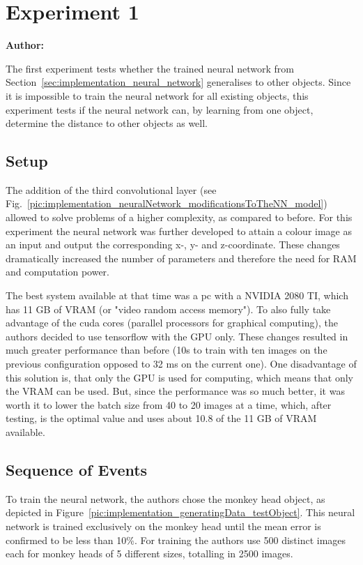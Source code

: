 \chapter{Experiment 1}
\label{cap:experiment1}

\textbf{Author: } 

The first experiment tests whether the trained neural network from Section~\ref{sec:implementation_neural_network} generalises to other objects. Since it is impossible to train the neural network for all existing objects, this experiment tests if the neural network can, by learning from one object, determine the distance to other objects as well.

\section{Setup}
The addition of the third convolutional layer (see Fig.~\ref{pic:implementation_neuralNetwork_modificationsToTheNN_model}) allowed to solve problems of a higher complexity, as compared to before. For this experiment the neural network was further developed to attain a colour image as an input and output the corresponding x-, y- and z-coordinate. These changes dramatically increased the number of parameters and therefore the need for RAM and computation power. 

The best system available at that time was a pc with a NVIDIA 2080 TI, which has 11 GB of VRAM (or "video random access memory"). To also fully take advantage of the cuda cores (parallel processors for graphical computing), the authors decided to use tensorflow with the GPU only. These changes resulted in much greater performance than before (10s to train with ten images on the previous configuration opposed to 32 ms on the current one). One disadvantage of this solution is, that only the GPU is used for computing, which means that only the VRAM can be used. But, since the performance was so much better, it was worth it to lower the batch size from 40 to 20 images at a time, which, after testing, is the optimal value and uses about 10.8 of the 11 GB of VRAM available.

\section{Sequence of Events}
To train the neural network, the authors chose the monkey head object, as depicted in Figure~\ref{pic:implementation_generatingData_testObject}. This neural network is trained exclusively on the monkey head until the mean error is confirmed to be less than 10\%. For training the authors use 500 distinct images each for monkey heads of 5 different sizes, totalling in 2500 images.

